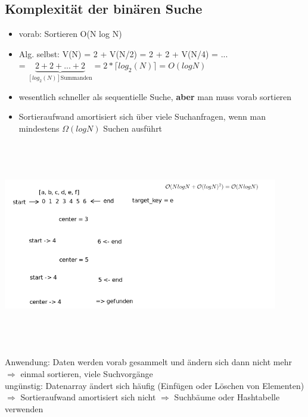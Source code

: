 \documentclass[11pt, fleqn]{scrreprt}
\begin{document}
		\subsection*{Komplexität der binären Suche}
		
		\begin{itemize}
			\item vorab: Sortieren O(N log N)
			\item Alg. selbst: V(N) = 2 + V(N/2) = 2 + 2 + V(N/4) = ...\\
			\hspace*{3cm} = $\underbrace{ 2 + 2 + ... + 2}_{[ log_2(N)] \text{Summanden}} = 2* \lceil log_2 (N) \rceil = O(logN)$
		\end{itemize}
		\begin{itemize}[label={$\Rightarrow$}]
			\item wesentlich schneller als sequentielle Suche, \textbf{aber} man muss vorab sortieren
			\item Sortieraufwand amortisiert sich über viele Suchanfragen, wenn man mindestens $\Omega(log N)$ Suchen ausführt
		\end{itemize}
	
		\includegraphics[width=12cm,height=9cm,keepaspectratio]{./Pictures/binaereSuche.png}
		
		Anwendung: Daten werden vorab gesammelt und ändern sich dann nicht mehr\\
		$\Rightarrow$ einmal sortieren, viele Suchvorgänge\\
		
		ungünstig: Datenarray ändert sich häufig (Einfügen oder Löschen von Elementen)\\
		$\Rightarrow$ Sortieraufwand amortisiert sich nicht $\Rightarrow$ Suchbäume oder Hashtabelle verwenden
		
\end{document}
